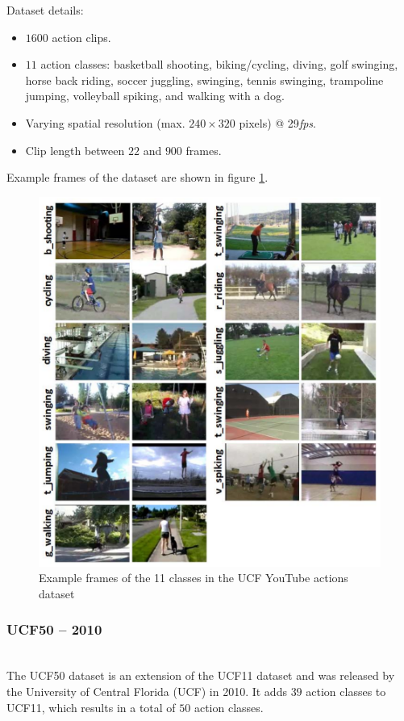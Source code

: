 Dataset details: \cite{_center_????-1}
\begin{itemize}
    \item $1600$ action clips.
    \item $11$ action classes: basketball shooting, biking/cycling, diving, golf swinging, horse back riding, soccer juggling, swinging, tennis swinging, trampoline jumping, volleyball spiking, and walking with a dog.
    \item Varying spatial resolution (max. $240 \times 320$ pixels) @ 29\textit{fps}.
    \item Clip length between $22$ and $900$ frames.
\end{itemize}

Example frames of the dataset are shown in figure \ref{fig:ucfyoutube_example}.

\begin{figure}[H]
    \centering
    \includegraphics[width=.7\textwidth]{img_datasets/ucfyoutube_example}
    \caption{Example frames of the 11 classes in the UCF YouTube actions dataset \cite{liu_recognizing_2009}}
    \label{fig:ucfyoutube_example}
\end{figure}


\subsubsection{UCF50 -- 2010}
\cite{reddy_recognizing_2013}\\
The UCF50 dataset is an extension of the UCF11 dataset and was released by the University of Central Florida (UCF) in 2010.
It adds $39$ action classes to UCF11, which results in a total of $50$ action classes.

